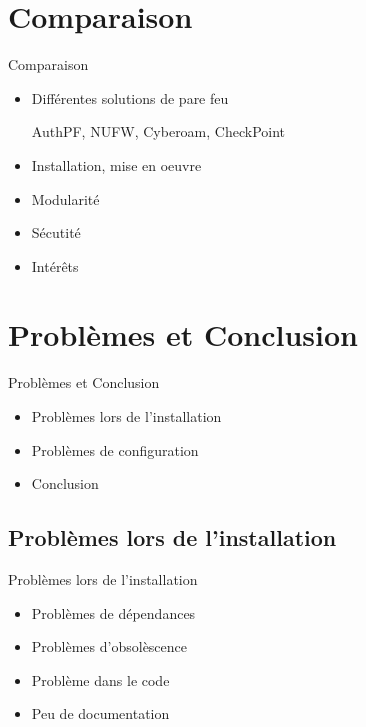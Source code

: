 \documentclass[t,12pt]{beamer}
\begin{document}
\section{Comparaison}                                                    %
\begin{frame}{Comparaison}                                                         %
    \begin{itemize}                                                   %
	\item Différentes solutions de pare feu
\begin{center}AuthPF, NUFW, Cyberoam, CheckPoint\end{center}
	\item Installation, mise en oeuvre
	\item Modularité
        \item Sécutité
        \item Intérêts
\end{itemize}
\end{frame}                                                            %


\section{Problèmes et Conclusion}                                                    %
\begin{frame}{Problèmes et Conclusion}                                                         %
    \begin{itemize}                                                   %
	\item Problèmes lors de l'installation
	\item Problèmes de configuration
	\item Conclusion
\end{itemize}
\end{frame}                                                            %
	\subsection{Problèmes lors de l'installation}
		\begin{frame}{Problèmes lors de l'installation}                    %
		\begin{itemize}
			\item Problèmes de dépendances
			\newline
			\item Problèmes d'obsolèscence
			\newline		
			\item Problème dans le code
			\newline
			\item Peu de documentation
		\end{itemize}
		\end{frame}
\end{document}
